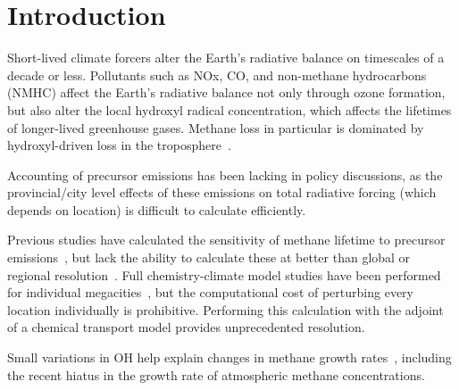 \section{Introduction}

Short-lived climate forcers alter the Earth's radiative balance on timescales of a decade or less. Pollutants such as NOx, CO, and non-methane hydrocarbons (NMHC) affect the Earth's radiative balance not only through ozone formation, but also alter the local hydroxyl radical concentration, which affects the lifetimes of longer-lived greenhouse gases. Methane loss in particular is dominated by hydroxyl-driven loss in the troposphere~\citep{ref:kirschke2013}.

Accounting of precursor emissions has been lacking in policy discussions, as the provincial/city level effects of these emissions on total radiative forcing (which depends on location) is difficult to calculate efficiently.

Previous studies have calculated the sensitivity of methane lifetime to precursor emissions~\citep{ref:holmes2013}, but lack the ability to calculate these at better than global or regional resolution~\citep{ref:naik2005,ref:macintosh2015}. Full chemistry-climate model studies have been performed for individual megacities~\citep{ref:dang2015}, but the computational cost of perturbing every location individually is prohibitive. Performing this calculation with the adjoint of a chemical transport model provides unprecedented resolution.

Small variations in OH help explain changes in methane growth rates~\citep{ref:mcnorton2016}, including the recent hiatus in the growth rate of atmospheric methane concentrations.